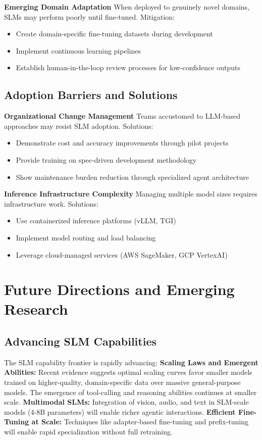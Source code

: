 \documentclass[11pt,a4paper]{article}
\begin{document}
\textbf{Emerging Domain Adaptation} \cite{thirdeye2025}
When deployed to genuinely novel domains, SLMs may perform poorly until fine-tuned. Mitigation:
\begin{itemize}
    \item Create domain-specific fine-tuning datasets during development
    \item Implement continuous learning pipelines
    \item Establish human-in-the-loop review processes for low-confidence outputs
\end{itemize}

\subsection{Adoption Barriers and Solutions}
\textbf{Organizational Change Management} \cite{belcak2025}
Teams accustomed to LLM-based approaches may resist SLM adoption. Solutions:
\begin{itemize}
    \item Demonstrate cost and accuracy improvements through pilot projects
    \item Provide training on spec-driven development methodology
    \item Show maintenance burden reduction through specialized agent architecture
\end{itemize}

\textbf{Inference Infrastructure Complexity} \cite{belcak2025}
Managing multiple model sizes requires infrastructure work. Solutions:
\begin{itemize}
    \item Use containerized inference platforms (vLLM, TGI)
    \item Implement model routing and load balancing
    \item Leverage cloud-managed services (AWS SageMaker, GCP VertexAI)
\end{itemize}


\section{Future Directions and Emerging Research}
\subsection{Advancing SLM Capabilities}
The SLM capability frontier is rapidly advancing: \cite{belcak2025}
\textbf{Scaling Laws and Emergent Abilities:} Recent evidence suggests optimal scaling curves favor smaller models trained on higher-quality, domain-specific data over massive general-purpose models\cite{belcak2025}. The emergence of tool-calling and reasoning abilities continues at smaller scale. \newline
\textbf{Multimodal SLMs:} Integration of vision, audio, and text in SLM-scale models (4-8B parameters) will enable richer agentic interactions\cite{belcak2025}. \newline
\textbf{Efficient Fine-Tuning at Scale:} Techniques like adapter-based fine-tuning and prefix-tuning will enable rapid specialization without full retraining.
\end{document}
